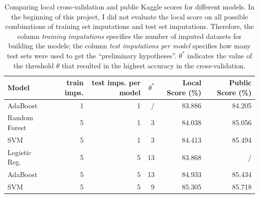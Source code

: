 \documentclass[a4paper,11pt]{article}
\begin{document}
\begin{table}[h]
  \centering
  \begin{tabular}{lrrrrr}
    \toprule
    Model                                                                     & train imps. & test imps. per model & $\theta^*$ & Local Score (\%) & Public Score (\%) \\
    \midrule
    AdaBoost                                                                  & 1           & 1                    & /          & 83.886           & 84.205            \\
    Random Forest                                                             & 5           & 1                    & 3          & 84.038           & 85.056            \\
    SVM                                                                       & 5           & 1                    & 3          & 
                                                                       84.413 & 85.494                                                                                 \\
Logistic Reg.                                                                 & 5           & 5                    & 13         & 83.868           & /                 \\
    AdaBoost                                                                  & 5           & 5                    & 13         & 84.933           & 85.434            \\
    SVM                                                                       & 5           & 5                    & 9          & 85.305           & 85.718            \\
    \bottomrule
  \end{tabular}
  \caption{{Comparing local cross-validation and public Kaggle
      scores for different models. In the beginning of this project, I
      did not evaluate the local score on all possible combinations of
      training set imputations and test set imputations. Therefore, the column \emph{training imputations} specifies the
      number of imputed datasets for building the models; the column
      \emph{test imputations per model} specifies how many test sets
      were used to get the ``preliminary hypotheses''. $\theta^*$
      indicates the value of the threshold $\theta$ that resulted in the highest accuracy in the cross-validation.}}
  \label{tab:localpublic}
\end{table}
\end{document}
